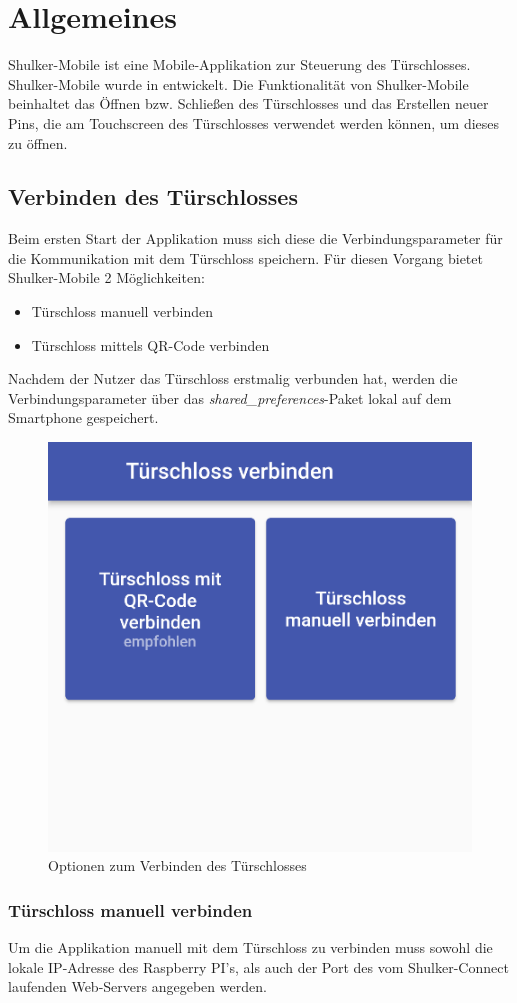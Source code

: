 \chapter{Allgemeines}
Shulker-Mobile ist eine Mobile-Applikation zur Steuerung des Türschlosses.
Shulker-Mobile wurde in  entwickelt.
Die Funktionalität von Shulker-Mobile beinhaltet das Öffnen bzw. Schließen des Türschlosses und das
Erstellen neuer Pins, die am Touchscreen des Türschlosses verwendet werden können, um dieses zu öffnen.

\section{Verbinden des Türschlosses}
Beim ersten Start der Applikation muss sich diese die Verbindungsparameter für die Kommunikation mit dem Türschloss speichern.
Für diesen Vorgang bietet Shulker-Mobile 2 Möglichkeiten:
\begin{itemize}
    \item Türschloss manuell verbinden
    \item Türschloss mittels QR-Code verbinden
\end{itemize}
Nachdem der Nutzer das Türschloss erstmalig verbunden hat, werden die Verbindungsparameter über das 
\textit{shared\_preferences}-Paket lokal auf dem Smartphone gespeichert. 

\begin{figure}[H]
    \begin{center}
        \includegraphics[width=.5\textwidth]{images/mobile/ConnectLockOptions.png}
        \caption{Optionen zum Verbinden des Türschlosses}
    \end{center}
\end{figure}

\subsection{Türschloss manuell verbinden}
Um die Applikation manuell mit dem Türschloss zu verbinden muss sowohl die lokale IP-Adresse des Raspberry PI's, als
auch der Port des vom Shulker-Connect laufenden Web-Servers angegeben werden.


